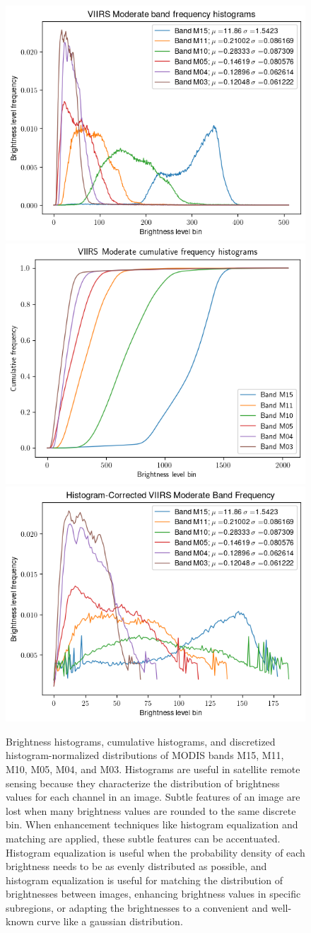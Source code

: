 \documentclass[12pt]{article}
\begin{document}
\begin{figure}[h!]
    \centering
    \includegraphics[width=.48\linewidth]{figures/p1/mod_histograms.png}
    \includegraphics[width=.48\linewidth]{figures/p1/mod_cumulative.png}
    \includegraphics[width=.48\linewidth]{figures/p1/mod_histograms_correct.png}
    \caption{Brightness histograms, cumulative histograms, and discretized histogram-normalized distributions of MODIS bands M15, M11, M10, M05, M04, and M03. Histograms are useful in satellite remote sensing because they characterize the distribution of brightness values for each channel in an image. Subtle features of an image are lost when many brightness values are rounded to the same discrete bin. When enhancement techniques like histogram equalization and matching are applied, these subtle features can be accentuated. Histogram equalization is useful when the probability density of each brightness needs to be as evenly distributed as possible, and histogram equalization is useful for matching the distribution of brightnesses between images, enhancing brightness values in specific subregions, or adapting the brightnesses to a convenient and well-known curve like a gaussian distribution.}
    \label{p1_histograms}
\end{figure}
\end{document}
